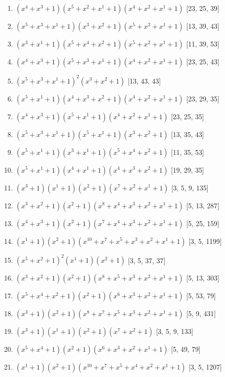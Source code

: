 \documentclass[10pt,twocolumn]{article}
\begin{document}
\begin{enumerate}
\item $(x^{4} + x^{3} + 1)(x^{5} + x^{2} + x^{1} + 1)(x^{4} + x^{2} + x^{1} + 1)$  [23, 25, 39]
\item $(x^{5} + x^{3} + x^{1} + 1)(x^{3} + x^{2} + 1)(x^{5} + x^{2} + x^{1} + 1)$  [13, 39, 43]
\item $(x^{3} + x^{1} + 1)(x^{5} + x^{4} + x^{2} + 1)(x^{5} + x^{2} + x^{1} + 1)$  [11, 39, 53]
\item $(x^{4} + x^{3} + 1)(x^{5} + x^{3} + x^{1} + 1)(x^{4} + x^{2} + x^{1} + 1)$  [23, 25, 43]
\item $(x^{5} + x^{3} + x^{1} + 1)^{2}(x^{3} + x^{2} + 1)$  [13, 43, 43]
\item $(x^{5} + x^{1} + 1)(x^{4} + x^{3} + x^{2} + 1)(x^{4} + x^{2} + x^{1} + 1)$  [23, 29, 35]
\item $(x^{4} + x^{3} + 1)(x^{5} + x^{1} + 1)(x^{4} + x^{2} + x^{1} + 1)$  [23, 25, 35]
\item $(x^{5} + x^{3} + x^{1} + 1)(x^{5} + x^{1} + 1)(x^{3} + x^{2} + 1)$  [13, 35, 43]
\item $(x^{5} + x^{1} + 1)(x^{3} + x^{1} + 1)(x^{5} + x^{4} + x^{2} + 1)$  [11, 35, 53]
\item $(x^{5} + x^{1} + 1)(x^{4} + x^{1} + 1)(x^{4} + x^{3} + x^{2} + 1)$  [19, 29, 35]
\item $(x^{3} + 1)(x^{1} + 1)(x^{2} + 1)(x^{7} + x^{2} + x^{1} + 1)$  [3, 5, 9, 135]
\item $(x^{3} + x^{2} + 1)(x^{2} + 1)(x^{8} + x^{4} + x^{3} + x^{2} + x^{1} + 1)$  [5, 13, 287]
\item $(x^{4} + x^{3} + 1)(x^{2} + 1)(x^{7} + x^{4} + x^{3} + x^{2} + x^{1} + 1)$  [5, 25, 159]
\item $(x^{1} + 1)(x^{2} + 1)(x^{10} + x^{7} + x^{5} + x^{3} + x^{2} + x^{1} + 1)$  [3, 5, 1199]
\item $(x^{5} + x^{2} + 1)^{2}(x^{1} + 1)(x^{2} + 1)$  [3, 5, 37, 37]
\item $(x^{3} + x^{2} + 1)(x^{2} + 1)(x^{8} + x^{5} + x^{3} + x^{2} + x^{1} + 1)$  [5, 13, 303]
\item $(x^{5} + x^{4} + x^{2} + 1)(x^{2} + 1)(x^{6} + x^{3} + x^{2} + x^{1} + 1)$  [5, 53, 79]
\item $(x^{3} + 1)(x^{2} + 1)(x^{8} + x^{7} + x^{5} + x^{3} + x^{2} + x^{1} + 1)$  [5, 9, 431]
\item $(x^{3} + 1)(x^{1} + 1)(x^{2} + 1)(x^{7} + x^{2} + 1)$  [3, 5, 9, 133]
\item $(x^{5} + x^{4} + 1)(x^{2} + 1)(x^{6} + x^{3} + x^{2} + x^{1} + 1)$  [5, 49, 79]
\item $(x^{1} + 1)(x^{2} + 1)(x^{10} + x^{7} + x^{5} + x^{4} + x^{2} + x^{1} + 1)$  [3, 5, 1207]

\end{enumerate}
\end{document}

